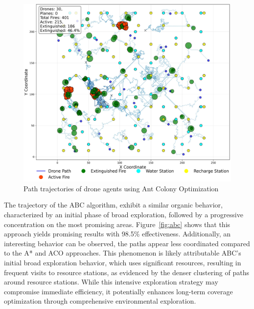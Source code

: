 \documentclass[11pt, a4paper]{article}
\begin{document}
\begin{figure}[htbp]
    \centering
    \includegraphics[width=1\linewidth]{figures/ACO_agent_paths.jpeg}
    \caption{Path trajectories of drone agents using Ant Colony Optimization}
    \label{fig:aco}
\end{figure}

The trajectory of the ABC algorithm, exhibit a similar organic behavior, characterized by an initial phase of broad exploration, followed by a progressive concentration on the most promising areas. Figure~\ref{fig:abc} shows that this approach yields promising results with 98.5\% effectiveness. Additionally, an interesting behavior can be observed, the paths appear less coordinated compared to the A* and ACO approaches. This phenomenon is likely attributable ABC's initial broad exploration behavior, which uses significant resources, resulting in frequent visits to resource stations, as evidenced by the denser clustering of paths around resource stations. While this intensive exploration strategy may compromise immediate efficiency, it potentially enhances long-term coverage optimization through comprehensive environmental exploration.
\end{document}
